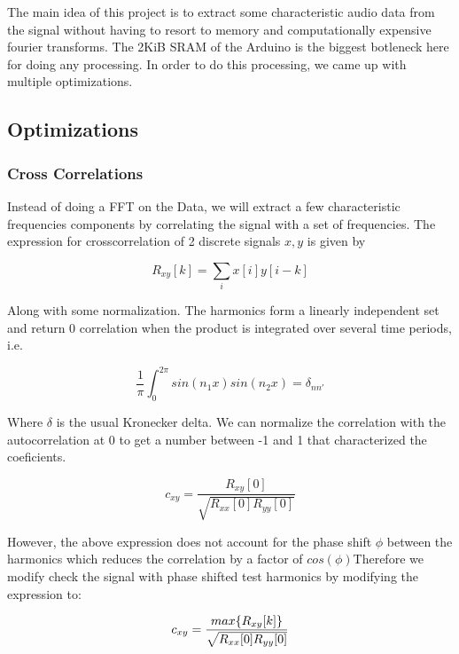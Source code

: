 
The main idea of this project is to extract some characteristic audio data from
the signal without having to resort to memory and computationally expensive
fourier transforms. The 2KiB SRAM of the Arduino is the biggest botleneck here
for doing any processing. In order to do this processing, we came up with
multiple optimizations. 

\subsection{Optimizations}

\subsubsection{Cross Correlations} 
Instead of doing a FFT on the Data, we will extract a few characteristic
frequencies components by correlating the signal with a set of frequencies. The
expression for crosscorrelation of 2 discrete signals \(x,y\) is given by

\begin{equation}
    R_{xy}[k] = \sum_{i} x[i]y[i-k]
\end{equation}

Along with some normalization. The harmonics form a linearly independent set and
return 0 correlation when the product is integrated over several time periods,
i.e.

\begin{equation}
    \frac{1}{\pi} \int_0^{2\pi}sin(n_1x)sin(n_2x) = \delta_{nn'}  
\end{equation} 

Where \(\delta\) is the usual Kronecker delta. We can normalize the correlation
with the autocorrelation at 0 to get a number between -1 and 1 that
characterized the coeficients.

\begin{equation}
    c_{xy} = \frac{R_{xy}[0]}{\sqrt{R_{xx}[0]R_{yy}[0]} }
\end{equation} 

However, the above expression does not account for the phase shift \(\phi\)
between the harmonics which reduces the correlation by a factor of
\(cos(\phi)\)Therefore we modify check the signal with phase shifted test
harmonics by modifying the expression to:

\begin{equation}
    c_{xy} = \frac{\mathnormal{max}\{R_{xy}[k]\}}{\sqrt{R_{xx}[0]R_{yy}[0]} }
\end{equation}


